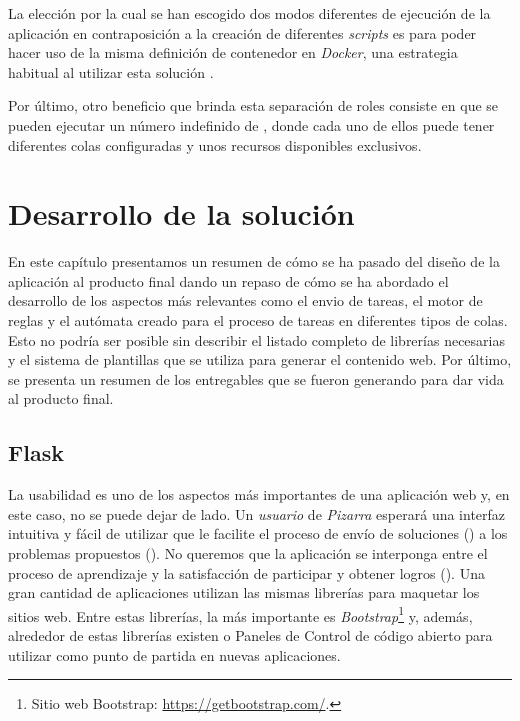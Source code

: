 \documentclass[11pt,spanish,listoffigures,listoftables]{tfgetsinf}
\begin{document}
La elección por la cual se han escogido dos modos diferentes de ejecución de la aplicación en contraposición a la creación de diferentes \textit{scripts} es para poder hacer uso de la misma definición de contenedor en \textit{Docker}, una estrategia habitual al utilizar esta solución \cite{link-sharing-docker-containers}.

Por último, otro beneficio que brinda esta separación de roles consiste en que se pueden ejecutar un número indefinido de , donde cada uno de ellos puede tener diferentes colas configuradas y unos recursos disponibles exclusivos.

\chapter{Desarrollo de la solución}
\label{chap:desarrollo}

En este capítulo presentamos un resumen de cómo se ha pasado del diseño de la aplicación al producto final dando un repaso de cómo se ha abordado el desarrollo de los aspectos más relevantes como el \gls{envio} de \gls{tarea}s, el motor de reglas y el autómata creado para el proceso de tareas en diferentes tipos de \gls{cola}s. Esto no podría ser posible sin describir el listado completo de librerías necesarias y el sistema de plantillas que se utiliza para generar el contenido web. Por último, se presenta un resumen de los entregables que se fueron generando para dar vida al producto final.

\section{Flask }

La usabilidad es uno de los aspectos más importantes de una aplicación web y, en este caso, no se puede dejar de lado. Un \textit{usuario} de \textit{Pizarra} esperará una interfaz intuitiva y fácil de utilizar que le facilite el proceso de envío de soluciones () a los problemas propuestos (). No queremos que la aplicación se interponga entre el proceso de aprendizaje y la satisfacción de participar y obtener logros (). Una gran cantidad de aplicaciones utilizan las mismas librerías para maquetar los sitios web. Entre estas librerías, la más importante es \textit{Bootstrap}\footnote{Sitio web Bootstrap: \url{https://getbootstrap.com/}.} y, además, alrededor de estas librerías existen  o Paneles de Control de código abierto para utilizar como punto de partida en nuevas aplicaciones.
	
\end{document}
